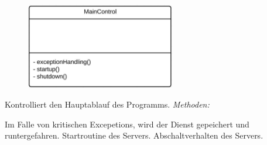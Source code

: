 \begin{itemize}
\begin{itemize}
                    
                    \begin{figure}[htb]
                    \centering
                    \includegraphics[width=6.5cm]{Diagramms/class/singleclass/ControlMain.pdf}
                    \end{figure}
                    \newline
                        Kontrolliert den Hauptablauf des Programms.
                        \newline
                        \emph{Methoden:}
                        \begin{itemize}
                                Im Falle von kritischen Excepetions, wird der Dienst gepeichert und runtergefahren.
                                Startroutine des Servers.
                                Abschaltverhalten des Servers.
                        \end{itemize}


\end{itemize}
\end{itemize}
